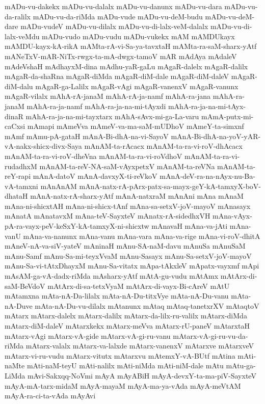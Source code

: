 {mADu-vu-dakekx
mADu-vu-dalalx
mADu-vu-danunx
mADu-vu-dara
mADu-vu-da-ralilx
mADu-vu-da-riMda
mADu-vude
mADu-vu-deM-budu
mADu-vu-deM-dare
mADu-vudeV
mADu-vu-dilalx
mADu-vu-di-lalx-veM-dalalx
mADu-vu-di-lalx-veMdu
mADu-vudo
mADu-vudu
mADu-vukekx
mAM
mAMDUkayx
mAMDU-kayx-kA-rikA
mAMta-rA-vi-Sa-ya-tavxtaH
mAMta-ra-saM-sharx-yAtf
mANeTxV-mAR-NiTx-rwgx-ta-mA-dwgx-tamoV
mAR
mAdAya
mAdaleV
mAdeVshaH
mAdhayxM-dina
mAdhu-yaR-gaLu
mAgaR-dalelx
mAgaR-dalilx
mAgaR-da-shaRna
mAgaR-diMda
mAgaR-diM-dale
mAgaR-diM-daleV
mAgaR-diM-dalu
mAgaR-ga-Lalilx
mAgaR-vAgi
mAgaR-vanenxV
mAgaR-vanunx
mAgaR-vilalx
mAhA-rA-janaM
mAhA-rA-ja-namf
mAhA-ra-jana
mAhA-ra-janaM
mAhA-ra-ja-namf
mAhA-ra-ja-na-mi-tAyxdi
mAhA-ra-ja-na-mi-tAyx-dinaR
mAhA-ra-ja-na-mi-tayxtarx
mAhA-sAvx-mi-ga-La-varu
mAmA-putx-mi-caCxsi
mAmapi
mAmeVva
mAmeV-va-ma-saM-mUDhoV
mAmeY-ta-simxnf
mAmf
mAmu-pA-gataH
mAnA-Bi-dhA-na-vi-SayoV
mAnA-Bi-dhA-na-yoV-yAR-vA-nakx-shicx-divx-Saya
mAnAM-ta-rAcacx
mAnAM-ta-ra-vi-roV-dhAcacx
mAnAM-ta-ra-vi-roV-dheVna
mAnAM-ta-ra-vi-roVdhoV
mAnAM-ta-ra-vi-rudadhxM
mAnAM-ta-reV-NA-saM-vAyxpetxV
mAnAM-ta-reVNa
mAnAM-ta-reY-rapi
mAnA-datoV
mAnA-davxyX-ti-reVkoV
mAnA-deV-ra-na-nAyx-nu-Ba-vA-tamxni
mAnAnAM
mAnA-natx-rA-pArx-patx-sa-mayx-geY-kA-tamxyX-boV-dhataH
mAnA-natx-rA-sharx-yAtf
mAnA-natxraM
mAnAni
mAna
mAnaM
mAna-ni-shicxtAH
mAna-ni-shicx-tAnf
mAna-sa-setxV-joV-mayoV
mAnasayx
mAnatA
mAnatavxM
mAna-teV-SayxteV
mAnatx-rA-sidedhxVH
mAna-vAyx-pA-ra-vayx-peV-keSxY-kA-tamxyX-ni-shicxtw
mAnavaH
mAna-va-jAti
mAna-vanU
mAna-va-nanunx
mAna-vanu
mAna-vara
mAna-va-rige
mAna-vi-roV-dhitA
mAneV-nA-va-siV-yateV
mAninaH
mAnu-SA-naM-davu
mAnuSa
mAnuSaM
mAnu-Samf
mAnu-Sa-mi-teyxVvaM
mAnu-Sasayx
mAnu-Sa-setxV-joV-mayoV
mAnu-Sa-vi-tAtxDhayxM
mAnu-Sa-vitatx
mApa-tAkxleV
mApatx-vayxmf
mApi
mAsAM-ga-vA-dadx-riMda
mAsharx-yAtf
mAtA-gu-vudu
mAtAmx
mAtArx-di-saM-BeVdoV
mAtArx-di-sa-tetxVyaM
mAtArx-di-vayx-Bi-cAreV
mAtU
mAtamxna
mAta-nA-Da-lilalx
mAta-nA-Du-titxVye
mAta-nA-Du-vanu
mAta-nA-Duve
mAta-nA-Du-vu-dilalx
mAtanunx
mAtaq
mAtaq-tanetxrXV
mAtaqtoV
mAtarx
mAtarx-dalelx
mAtarx-dalilx
mAtarx-da-lilx-ru-valilx
mAtarx-diMda
mAtarx-diM-daleV
mAtarxkekx
mAtarx-meVva
mAtarx-rU-paneV
mAtarxtaH
mAtarx-vAgi
mAtarx-vA-gide
mAtarx-vA-gi-ru-vanu
mAtarx-vA-gi-ru-vu-da-riMda
mAtarx-valalx
mAtarx-va-lalxde
mAtarx-vanenxV
mAtarxve
mAtarxveV
mAtarx-vi-ru-vudu
mAtarx-vitutx
mAtarxvu
mAtemxY-vA-BUtf
mAtina
mAti-naMte
mAti-naM-teyU
mAti-nalilx
mAti-niMda
mAti-niM-dale
mAtu
mAtu-ga-LiMda
mAvi-Sakxqq-NoVmi
mAyA
mAyABiH
mAyA-devxY-ta-ma-piV-SayxteV
mAyA-mA-tarx-midaM
mAyA-mayaM
mAyA-ma-ya-vAda
mAyA-meVtAM
mAyA-ra-ci-ta-vAda
mAyAvi
}
